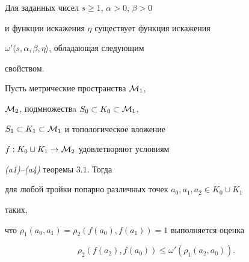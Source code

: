 \begin{lems}


Для заданных чисел $s\geq 1$, $\alpha >0$, $\beta >0$ 


и функции искажения $\eta$ существует функция искажения


$\omega'\langle s, \alpha, \beta, \eta \rangle $, обладающая следующим


свойством.





Пусть метрические пространства ${\cal M}_1$,


${\cal M}_2$, подмножествa $S_0 \subset K_0 \subset {\cal M}_1$, 


$S_1 \subset K_1 \subset {\cal M}_1$ и топологическое вложение 


$f: K_0\cup K_1 \to {\cal M}_2$ удовлетворяют условиям


{\em (a1)--(a4)} теоремы $3.1$. Тогда


для любой тройки попарно различных точек $a_0, a_1, a_2 \in K_0\cup K_1 $ 


таких,


что $\rho_1(a_0, a_1)=\rho_2(f(a_0), f(a_1))=1$ выполняется оценка


\begin{equation}


\rho_2(f(a_2), f(a_0)) \leq \omega'(\rho_1(a_2, a_0)). 


\end{equation}


\end{lems}








